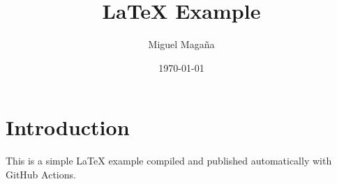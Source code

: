 \documentclass{article}
\title{LaTeX Example}
\author{Miguel Magaña}
\date{\today}
\begin{document}
\maketitle

\section{Introduction}

This is a simple \LaTeX{} example compiled and published automatically with GitHub Actions.
\end{document}
